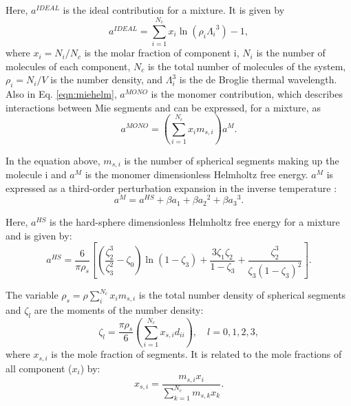 Here, $a^{IDEAL}$ is the ideal contribution for a mixture. It is given by
\begin{equation}
a^{IDEAL} = \sum_{i=1}^{N_{c}} x_{i}\ln{(\rho_{i}{\Lambda_{i}}^3)} -1 ,
\label{eqn:aideal}
\end{equation}
where $x_{i}=N_{i}/N_{c}$ is the molar fraction of component i, $N_{i}$ is the number of molecules of each component, $N_{c}$ is the total number of molecules of the system, $\rho_{i}=N_{i}/V$ is the number density, and $\Lambda_{i}^3$ is the de Broglie thermal wavelength. Also in Eq. \ref{eqn:miehelm}, $a^{MONO}$ is the monomer contribution, which  describes interactions between Mie segments and can be expressed, for a mixture, as
\begin{equation}
a^{MONO} = \left(\sum_{i=1}^{N_{c}} x_{i}m_{s,i} \right)a^{M} .
\label{eqn:amonomer}
\end{equation}

In the equation above, $m_{s,i}$ is the number of spherical segments making up the molecule i and $a^{M}$  is the monomer dimensionless Helmholtz free energy. $a^{M}$ is expressed as a third-order perturbation expansion in the inverse temperature \cite{bh1976}:
\begin{equation}
a^{M} = a^{HS}+\beta{a_{1}}+\beta{a_{2}}^2+\beta{a_{3}}^3 . 
\label{eqn:aM}
\end{equation}

Here, $a^{HS}$ is the hard-sphere dimensionless Helmholtz free energy for a mixture and is given by:
\begin{equation}
a^{HS} = \frac{6}{\pi\rho_{s}}\left[\left(\frac{\zeta^3_2}{\zeta^2_3}-\zeta_0 \right)\ln(1-\zeta_3)+\frac{3\zeta_{1}\zeta_{2}}{1-\zeta_3}+ \frac{\zeta^3_2}{\zeta_{3}(1-\zeta_3)^2}\right] .
\label{eqn:hs}
\end{equation}

The variable $\rho_{s}=\rho\sum_{i}^{N_c} x_{i}m_{s,i}$ is the total number density of spherical segments and $\zeta_l$ are the moments of the number density:
\begin{equation}
\zeta_l = \frac{\pi\rho_s}{6}\left(\sum_{i=1}^{N_c} x_{s,i}d_{ii} \right), \quad l = 0,1,2,3 ,
\label{eqn:zetal}
\end{equation}
where $x_{s,i}$ is the mole fraction of segments. It is related to the mole fractions of all component ($x_i$) by:
\begin{equation}
x_{s,i} = \frac{m_{s,i}x_i}{\sum_{k=1}^{N_c} m_{s,k}x_{k} } .
\label{eqn:xsi}
\end{equation}


